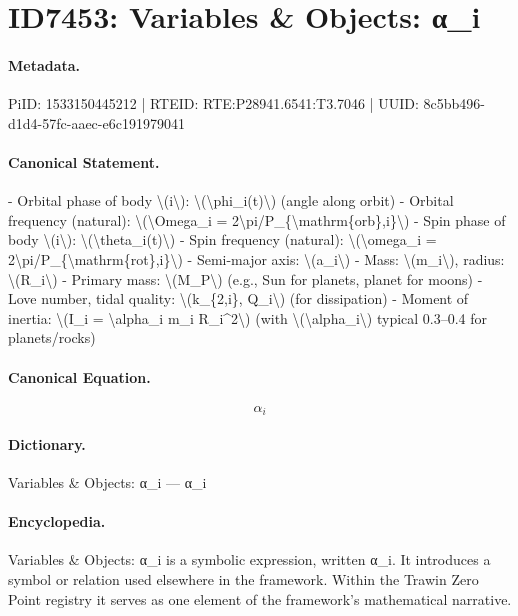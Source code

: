 \section*{ID7453: Variables \& Objects: α\_i}
\paragraph{Metadata.}
PiID: 1533150445212 | RTEID: RTE:P28941.6541:T3.7046 | UUID: 8c5bb496-d1d4-57fc-aaec-e6c191979041

\paragraph{Canonical Statement.}
- Orbital phase of body \textbackslash{}(i\textbackslash{}): \textbackslash{}(\textbackslash{}phi\_i(t)\textbackslash{}) (angle along orbit) - Orbital frequency (natural): \textbackslash{}(\textbackslash{}Omega\_i = 2\textbackslash{}pi/P\_\{\textbackslash{}mathrm\{orb\},i\}\textbackslash{}) - Spin phase of body \textbackslash{}(i\textbackslash{}): \textbackslash{}(\textbackslash{}theta\_i(t)\textbackslash{}) - Spin frequency (natural): \textbackslash{}(\textbackslash{}omega\_i = 2\textbackslash{}pi/P\_\{\textbackslash{}mathrm\{rot\},i\}\textbackslash{}) - Semi-major axis: \textbackslash{}(a\_i\textbackslash{}) - Mass: \textbackslash{}(m\_i\textbackslash{}), radius: \textbackslash{}(R\_i\textbackslash{}) - Primary mass: \textbackslash{}(M\_P\textbackslash{}) (e.g., Sun for planets, planet for moons) - Love number, tidal quality: \textbackslash{}(k\_\{2,i\}, Q\_i\textbackslash{}) (for dissipation) - Moment of inertia: \textbackslash{}(I\_i = \textbackslash{}alpha\_i m\_i R\_i\textasciicircum{}2\textbackslash{}) (with \textbackslash{}(\textbackslash{}alpha\_i\textbackslash{}) typical 0.3–0.4 for planets/rocks)

\paragraph{Canonical Equation.}
\[
\alpha_i
\]

\paragraph{Dictionary.}
Variables \& Objects: α\_i — α\_i

\paragraph{Encyclopedia.}
Variables \& Objects: α\_i is a symbolic expression, written α\_i. It introduces a symbol or relation used elsewhere in the framework. Within the Trawin Zero Point registry it serves as one element of the framework's mathematical narrative.
